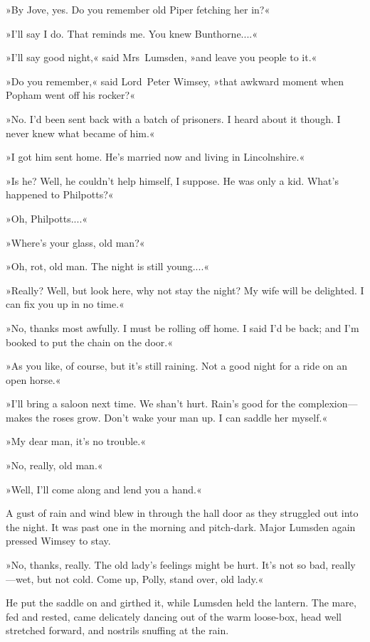 »By Jove, yes. Do you remember old Piper fetching her in?«

»I'll say I do. That reminds me. You knew Bunthorne....«

»I'll say good night,« said Mrs~Lumsden, »and leave you people to it.«

»Do you remember,« said Lord~Peter Wimsey, »that awkward moment when Popham went off his rocker?«

»No. I'd been sent back with a batch of prisoners. I heard about it though. I never knew what became of him.«

»I got him sent home. He's married now and living in Lincolnshire.«

»Is he? Well, he couldn't help himself, I suppose. He was only a kid. What's happened to Philpotts?«

»Oh, Philpotts....«

\divider
»Where's your glass, old man?«

\divider
»Oh, rot, old man. The night is still young....«

\divider
»Really? Well, but look here, why not stay the night? My wife will be delighted. I can fix you up in no time.«

»No, thanks most awfully. I must be rolling off home. I said I'd be back; and I'm booked to put the chain on the door.«

»As you like, of course, but it's still raining. Not a good night for a ride on an open horse.«

»I'll bring a saloon next time. We shan't hurt. Rain's good for the complexion—makes the roses grow. Don't wake your man up. I can saddle her myself.«

»My dear man, it's no trouble.«

»No, really, old man.«

»Well, I'll come along and lend you a hand.«

A gust of rain and wind blew in through the hall door as they struggled out into the night. It was past one in the morning and pitch-dark. Major Lumsden again pressed Wimsey to stay.

»No, thanks, really. The old lady's feelings might be hurt. It's not so bad, really—wet, but not cold. Come up, Polly, stand over, old lady.«

He put the saddle on and girthed it, while Lumsden held the lantern. The mare, fed and rested, came delicately dancing out of the warm loose-box, head well stretched forward, and nostrils snuffing at the rain.

